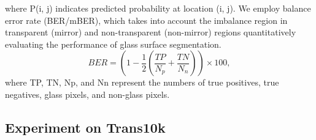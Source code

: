 \documentclass[10pt,twocolumn,letterpaper]{article}
\begin{document}
where P(i, j) indicates predicted probability at location (i, j).
We employ balance error rate (BER/mBER), which takes into account the imbalance region in transparent (mirror) and non-transparent (non-mirror) regions quantitatively evaluating the performance of glass surface segmentation.
\begin{equation}
\label{eqn:03}
{\textit{BER}}=(1-\frac{1}{2}(\frac{TP}{\textit{N}_{p}}+\frac{TN}{\textit{N}_{n}}))\times{100},
\end{equation}
where TP, TN, Np, and Nn represent the numbers of true positives, true negatives, glass pixels, and non-glass pixels.
\subsection{Experiment on Trans10k}
\end{document}
